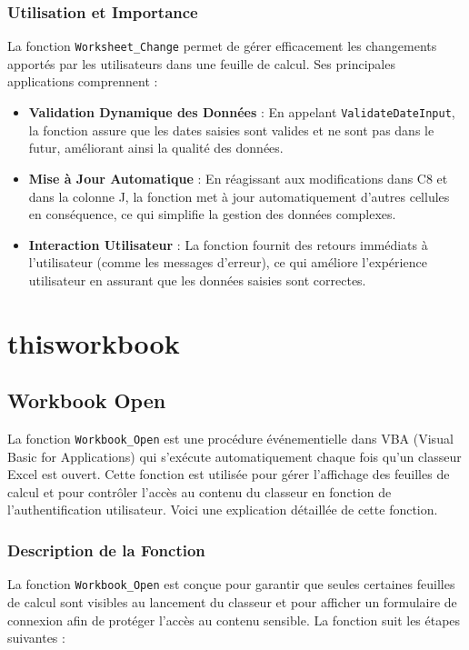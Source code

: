 \documentclass[a4paper, oneside, 12pt, final]{extreport}
\begin{document}
\subsubsection{Utilisation et Importance}

La fonction \texttt{Worksheet\_Change} permet de gérer efficacement les changements apportés par les utilisateurs dans une feuille de calcul. Ses principales applications comprennent :

\begin{itemize}
    \item \textbf{Validation Dynamique des Données} : En appelant \texttt{ValidateDateInput}, la fonction assure que les dates saisies sont valides et ne sont pas dans le futur, améliorant ainsi la qualité des données.
    \item \textbf{Mise à Jour Automatique} : En réagissant aux modifications dans C8 et dans la colonne J, la fonction met à jour automatiquement d'autres cellules en conséquence, ce qui simplifie la gestion des données complexes.
    \item \textbf{Interaction Utilisateur} : La fonction fournit des retours immédiats à l'utilisateur (comme les messages d'erreur), ce qui améliore l'expérience utilisateur en assurant que les données saisies sont correctes.
\end{itemize}

 \section{thisworkbook}
 \subsection{Workbook Open}

La fonction \texttt{Workbook\_Open} est une procédure événementielle dans VBA (Visual Basic for Applications) qui s'exécute automatiquement chaque fois qu'un classeur Excel est ouvert. Cette fonction est utilisée pour gérer l'affichage des feuilles de calcul et pour contrôler l'accès au contenu du classeur en fonction de l'authentification utilisateur. Voici une explication détaillée de cette fonction.

\subsubsection{Description de la Fonction}

La fonction \texttt{Workbook\_Open} est conçue pour garantir que seules certaines feuilles de calcul sont visibles au lancement du classeur et pour afficher un formulaire de connexion afin de protéger l'accès au contenu sensible. La fonction suit les étapes suivantes :
\end{document}
